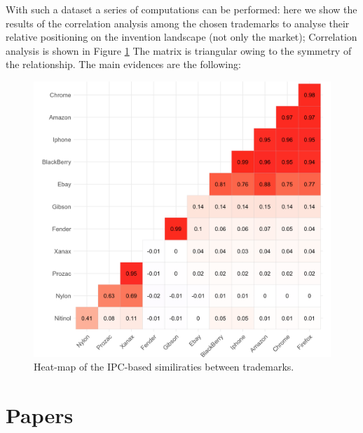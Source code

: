 \documentclass[]{book}
\begin{document}
With such a dataset a series of computations can be performed: here we
show the results of the correlation analysis among the chosen trademarks
to analyse their relative positioning on the invention landscape (not
only the market); Correlation analysis is shown in Figure
\ref{fig:similartm} The matrix is triangular owing to the symmetry of
the relationship. The main evidences are the following:

\begin{figure}

{\centering \includegraphics[width=0.8\linewidth]{_bookdown_files/figures/correlation_matrix_tm} 

}

\caption{Heat-map of the IPC-based similiraties between trademarks.}\label{fig:similartm}
\end{figure}

\chapter{Papers}\label{papers}
\end{document}
